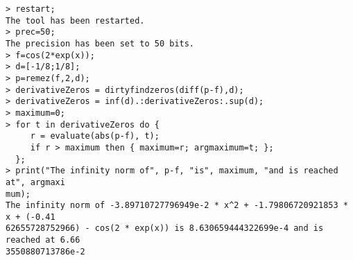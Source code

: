\begin{center}\begin{minipage}{15cm}\begin{Verbatim}[frame=single]
> restart;
The tool has been restarted.
> prec=50;
The precision has been set to 50 bits.
> f=cos(2*exp(x));
> d=[-1/8;1/8];
> p=remez(f,2,d);
> derivativeZeros = dirtyfindzeros(diff(p-f),d);
> derivativeZeros = inf(d).:derivativeZeros:.sup(d);
> maximum=0;
> for t in derivativeZeros do {
     r = evaluate(abs(p-f), t);
     if r > maximum then { maximum=r; argmaximum=t; };
  };
> print("The infinity norm of", p-f, "is", maximum, "and is reached at", argmaxi
mum);
The infinity norm of -3.89710727796949e-2 * x^2 + -1.79806720921853 * x + (-0.41
62655728752966) - cos(2 * exp(x)) is 8.630659444322699e-4 and is reached at 6.66
3550880713786e-2
\end{Verbatim}
\end{minipage}\end{center}
